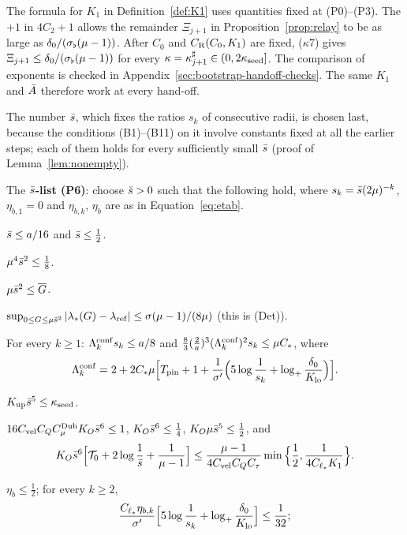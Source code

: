 The formula for $K_1$ in Definition~\ref{def:K1} uses quantities fixed at
(P0)--(P3). The $+1$ in $4C_2+1$ allows the remainder $\Xi_{j+1}$ in
Proposition~\ref{prop:relay} to be as large as $\delta_0/(\sigma_\flat(\mu-1))$.
After $C_0$ and $C_{\mathrm R}(C_0,K_1)$ are fixed, ($\kappa$7) gives
$\Xi_{j+1}\le\delta_0/(\sigma_\flat(\mu-1))$ for every
$\kappa=\kappa^\sharp_{j+1}\in(0,2\kappa_{\mathrm{seed}}]$.
The comparison of exponents is checked in
Appendix~\ref{sec:bootstrap-handoff-checks}. The same $K_1$ and $\bar A$
therefore work at every hand-off.

The number $\bar s$, which fixes the ratios $s_k$ of consecutive radii, is chosen
last, because the conditions (B1)--(B11) on it involve constants fixed at all the
earlier steps; each of them holds for every
sufficiently small $\bar s$ (proof of Lemma~\ref{lem:nonempty}).

\begin{definition}
\label{def:P6}
The \textbf{$\bar s$-list (P6)}: choose $\bar s>0$ such that the following hold,
where $s_k=\bar s(2\mu)^{-k}$, $\eta_{b,1}=0$ and $\eta_{b,k}$, $\eta_b$ are as in
Equation~\eqref{eq:etab}.
\begin{description}[font=\normalfont]
\item[\textup{(B1)}] $\bar s\le a/16$ and $\bar s\le\frac12$.
\item[\textup{(B2)}] $\mu^4\bar s^2\le\frac18$.
\item[\textup{(B3)}] $\mu\bar s^2\le\overline{G}$.
\item[\textup{(B4)}] $\sup_{0\le G\le \mu\bar s^2}|\lambda_*(G)-\lambda_{\mathrm{ref}}|\le\sigma(\mu-1)/(8\mu)$
  (this is (Det)).
\item[\textup{(B5)}] For every $k\ge1$: $\Lambda^{\mathrm{conf}}_ks_k\le a/8$ and
  $\frac83(\frac2a)^3(\Lambda^{\mathrm{conf}}_k)^2s_k\le\mu C_{*}$, where
  \[
  \Lambda^{\mathrm{conf}}_k=2+2C_{*}\mu\Big[T_{\mathrm{pin}}+1+\frac1{\sigma'}\Big(5\log\frac1{s_k}+\log_+\frac{\delta_0}{K_{\mathrm{lo}}}\Big)\Big].
  \]
\item[\textup{(B6)}] $K_{\mathrm{up}}\bar s^5\le\kappa_{\mathrm{seed}}$.
\item[\textup{(B7)}] $16C_{\mathrm{vel}} C_QC^{\mathrm{Duh}}_\mu K_{O}\bar s^6\le1$, $K_{O}\bar s^6\le\frac14$,
  $K_{O}\mu\bar s^5\le\frac12$, and
  \begin{equation}
  \label{eq:E22}
  K_{O}\bar s^6\Big[\mathcal{T}_0+2\log\frac1{\bar s}+\frac1{\mu-1}\Big]\le\frac{\mu-1}{4C_{\mathrm{vel}} C_QC_\tau}\min\Big\{\frac12,\frac1{4C_{\ell_*} K_1}\Big\}.
  \end{equation}
\item[\textup{(B8)}] $\eta_b\le\frac12$; for every $k\ge2$,
  \[
  \frac{C_{\ell_*}\eta_{b,k}}{\sigma'}\Big[5\log\frac1{s_k}+\log_+\frac{\delta_0}{K_{\mathrm{lo}}}\Big]\le\frac1{32};
\]
\end{description}
\end{definition}
